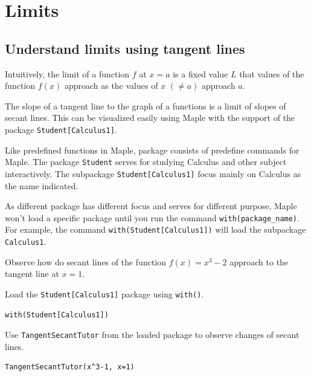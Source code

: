 \documentclass[en,11pt,simple]{elegantbook}
\let\BeginKnitrBlock\begin \let\EndKnitrBlock\end
\begin{document}
\hypertarget{limits}{%
\chapter{Limits}\label{limits}}

\hypertarget{understand-limits-using-tangent-lines}{%
\section{Understand limits using tangent lines}\label{understand-limits-using-tangent-lines}}

Intuitively, the limit of a function \(f\) at \(x=a\) is a fixed value \(L\) that values of the function \(f(x)\) approach as the values of \(x\) \((\ne a)\) approach \(a\).

The slope of a tangent line to the graph of a functions is a limit of slopes of secant lines. This can be visualized easily using Maple with the support of the package \texttt{Student{[}Calculus1{]}}.

Like predefined functions in Maple, package consists of predefine commands for Maple. The package \texttt{Student} serves for studying Calculus and other subject interactively. The subpackage \texttt{Student{[}Calculus1{]}} focus mainly on Calculus as the name indicated.

As different package has different focus and serves for different purpose, Maple won't load a specific package until you run the command \texttt{with(package\_name)}. For example, the command
\texttt{with(Student{[}Calculus1{]})} will load the subpackage \texttt{Calculus1}.

\BeginKnitrBlock{example}{}{}
\protect\hypertarget{exm:unnamed-chunk-11}{}{\label{exm:unnamed-chunk-11} }
Observe how do secant lines of the function \(f(x)=x^3-2\) approach to the tangent line at \(x=1\).
\EndKnitrBlock{example}

\BeginKnitrBlock{solution}{}{}
{}Load the \texttt{Student{[}Calculus1{]}} package using \texttt{with()}.

\begin{verbatim}
with(Student[Calculus1])
\end{verbatim}

Use \texttt{TangentSecantTutor} from the loaded package to observe changes of secant lines.

\begin{verbatim}
TangentSecantTutor(x^3-1, x=1)
\end{verbatim}
\EndKnitrBlock{solution}
\end{document}
